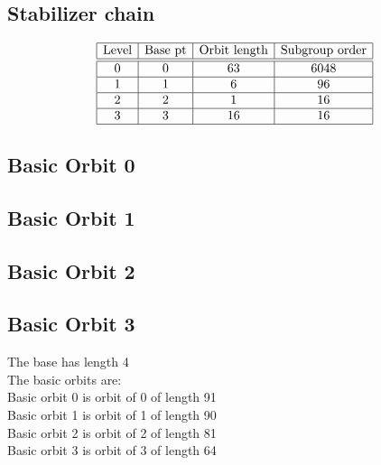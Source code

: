 \subsection*{Stabilizer chain}


$$
\begin{array}{|c|c|c|c|}
\hline
\mbox{Level} & \mbox{Base pt} & \mbox{Orbit length} & \mbox{Subgroup order}\\
\hline
\hline
0 & 0 & 63 & 6048\\
\hline
1 & 1 & 6 & 96\\
\hline
2 & 2 & 1 & 16\\
\hline
3 & 3 & 16 & 16\\
\hline
\end{array}
$$

\subsection*{Basic Orbit 0}



\bigskip

\subsection*{Basic Orbit 1}



\bigskip

\subsection*{Basic Orbit 2}



\bigskip

\subsection*{Basic Orbit 3}



\bigskip
The base has length 4\\
The basic orbits are: \\
Basic orbit 0 is orbit of 0 of length 91\\
Basic orbit 1 is orbit of 1 of length 90\\
Basic orbit 2 is orbit of 2 of length 81\\
Basic orbit 3 is orbit of 3 of length 64\\


